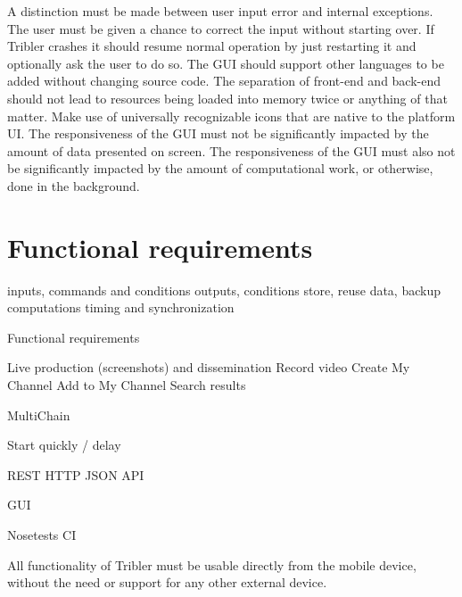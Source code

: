 A distinction must be made between user input error and internal exceptions.
The user must be given a chance to correct the input without starting over.
If Tribler crashes it should resume normal operation by just restarting it and optionally ask the user to do so.
The GUI should support other languages to be added without changing source code.
The separation of front-end and back-end should not lead to resources being loaded into memory twice or anything of that matter.
Make use of universally recognizable icons that are native to the platform UI.
The responsiveness of the GUI must not be significantly impacted by the amount of data presented on screen.
The responsiveness of the GUI must also not be significantly impacted by the amount of computational work, or otherwise, done in the background.


\section{Functional requirements}

inputs, commands and conditions
outputs, conditions
store, reuse data, backup
computations
timing and synchronization


Functional requirements

Live production (screenshots) and dissemination
Record video
Create My Channel
Add to My Channel
Search results

MultiChain

Start quickly / delay

REST HTTP JSON API

GUI

Nosetests CI


All functionality of Tribler must be usable directly from the mobile device, without the need or support for any other external device.

